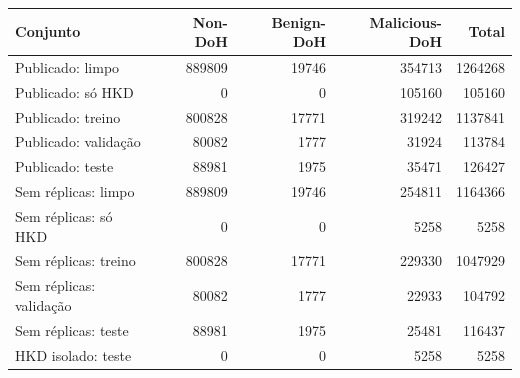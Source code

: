 \begin{tabular}{lrrrr}
\hline
\textbf{Conjunto} & \textbf{Non-DoH} & \textbf{Benign-DoH} & \textbf{Malicious-DoH} & \textbf{Total} \\ \hline
Publicado: limpo & 889809 & 19746 & 354713 & 1264268 \\
Publicado: só HKD & 0 & 0 & 105160 & 105160 \\
Publicado: treino & 800828 & 17771 & 319242 & 1137841 \\
Publicado: validação & 80082 & 1777 & 31924 & 113784 \\
Publicado: teste & 88981 & 1975 & 35471 & 126427 \\
\hline
Sem réplicas: limpo & 889809 & 19746 & 254811 & 1164366 \\
Sem réplicas: só HKD & 0 & 0 & 5258 & 5258 \\
Sem réplicas: treino & 800828 & 17771 & 229330 & 1047929 \\
Sem réplicas: validação & 80082 & 1777 & 22933 & 104792 \\
Sem réplicas: teste & 88981 & 1975 & 25481 & 116437 \\
\hline
HKD isolado: teste & 0 & 0 & 5258 & 5258 \\
\hline
\end{tabular}
